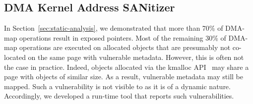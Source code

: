 \subsection{DMA Kernel Address SANitizer}\label{sec:dma-kasan} 

In Section~\ref{sec:static-analysis}, we demonstrated that more than 70\% of DMA-map operations result in exposed pointers. 
Most of the remaining 30\% of DMA-map operations are executed on allocated objects that are presumably not co-located on the same page with vulnerable metadata. However, this is often not the case in practice.
Indeed, objects allocated via the kmalloc API~\cite{Cor07} may share a page with objects of similar size. As a result, vulnerable metadata may still be mapped. 
%
Such a vulnerability is not visible to \tool as it is of a dynamic nature. Accordingly, we developed a run-time tool that reports such vulnerabilities. 


